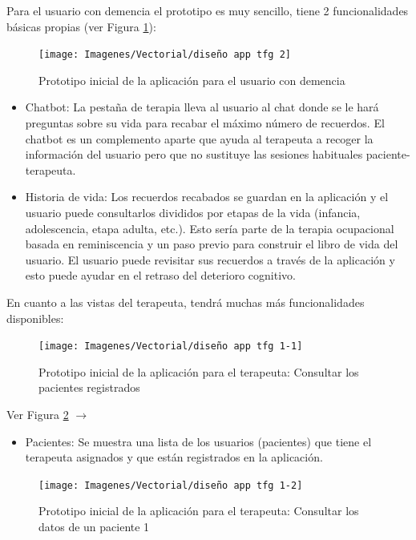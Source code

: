 Para el usuario con demencia el prototipo es muy sencillo, tiene 2 funcionalidades básicas propias (ver Figura \ref{fig:diseñoinicialappusuario}):

\begin{figure}[h]
	\centering
	\texttt{[image: Imagenes/Vectorial/diseño app tfg 2]}
	\caption{Prototipo inicial de la aplicación para el usuario con demencia}
	\label{fig:diseñoinicialappusuario}
\end{figure}

\begin{itemize}
	\item Chatbot: La pestaña de terapia lleva al usuario al chat donde se le hará preguntas sobre su vida para recabar el máximo número de recuerdos. El chatbot es un complemento aparte que ayuda al terapeuta a recoger la información del usuario pero que no sustituye las sesiones habituales paciente-terapeuta.
	\item Historia de vida: Los recuerdos recabados se guardan en la aplicación y el usuario puede consultarlos divididos por etapas de la vida (infancia, adolescencia, etapa adulta, etc.). Esto sería parte de la terapia ocupacional basada en reminiscencia y un paso previo para construir el libro de vida del usuario. El usuario puede revisitar sus recuerdos a través de la aplicación y esto puede ayudar en el retraso del deterioro cognitivo.
\end{itemize}

En cuanto a las vistas del terapeuta, tendrá muchas más funcionalidades disponibles:

\begin{figure}[h]
	\centering
	\texttt{[image: Imagenes/Vectorial/diseño app tfg 1-1]}
	\caption{Prototipo inicial de la aplicación para el terapeuta: Consultar los pacientes registrados}
	\label{fig:diseñoinicialappterapeuta1}
\end{figure}

Ver Figura \ref{fig:diseñoinicialappterapeuta1} $\rightarrow$
\begin{itemize}
	\item Pacientes: Se muestra una lista de los usuarios (pacientes) que tiene el terapeuta asignados y que están registrados en la aplicación. 
\end{itemize}

\begin{figure}[h]
	\centering
	\texttt{[image: Imagenes/Vectorial/diseño app tfg 1-2]}
	\caption{Prototipo inicial de la aplicación para el terapeuta: Consultar los datos de un paciente 1}
	\label{fig:diseñoinicialappterapeuta2}
\end{figure}

